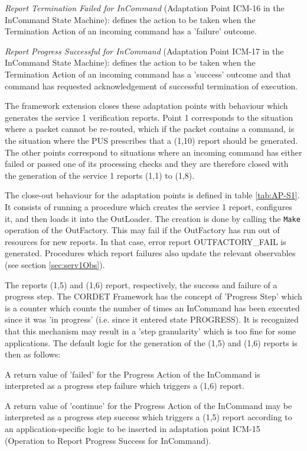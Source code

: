 \documentclass[a4paper,10pt]{article}
\newenvironment{fw_itemize}						%
{\begin{itemize}
  \setlength{\itemsep}{1mm}
  \setlength{\parskip}{0pt}
  \setlength{\parsep}{0pt}}
{\end{itemize}}
\newenvironment{fw_enumerate}					%
{\begin{enumerate}
  \setlength{\itemsep}{1mm}
  \setlength{\parskip}{0pt}
  \setlength{\parsep}{0pt}}
{\end{enumerate}}
\begin{document}
\begin{fw_enumerate}
\item \textit{Report Termination Failed for InCommand} (Adaptation Point ICM-16 in the InCommand State Machine): defines the action to be taken when the Termination Action of an incoming command has a 'failure' outcome.
\item \textit{Report Progress Successful for InCommand} (Adaptation Point ICM-17 in the InCommand State Machine): defines the action to be taken when the Termination Action of an incoming command has a 'success' outcome and that command has requested acknowledgement of successful termination of execution.
\end{fw_enumerate}

The framework extension closes these adaptation points with behaviour which generates the service 1 verification reports. Point 1 corresponds to the situation where a packet cannot be re-routed, which if the packet contains a command, is the situation where the PUS prescribes that a (1,10) report should be generated. The other points correspond to situations where an incoming command has either failed or passed one of its processing checks and they are therefore closed with the generation of the service 1 reports (1,1) to (1,8). 

The close-out behaviour for the adaptation points is defined in table \ref{tab:AP-S1}. It consists of running a procedure which creates the service 1 report, configures it, and then loads it into the OutLoader. The creation is done by calling the \texttt{Make} operation of the OutFactory. This may fail if the OutFactory has run out of resources for new reports. In that case, error report OUTFACTORY\_FAIL is generated. Procedures which report failures also update the relevant observables (see section \ref{sec:serv1Obs}).

The reports (1,5) and (1,6) report, respectively, the success and failure of a progress step. The CORDET Framework has the concept of 'Progress Step' which is a counter which counts the number of times an InCommand has been executed since it was 'in progress' (i.e. since it entered state PROGRESS). It is recognized that this mechanism may result in a 'step granularity' which is too fine for some applications. The default logic for the generation of the (1,5) and (1,6) reports is then as follows:

\begin{fw_itemize}
\item A return value of 'failed' for the Progress Action of the InCommand is interpreted as a progress step failure which triggers a (1,6) report. 
\item A return value of 'continue' for the Progress Action of the InCommand may be interpreted as a progress step success which triggers a (1,5) report according to an application-specific logic to be inserted in adaptation point ICM-15 (Operation to Report Progress Success for InCommand). 
\end{fw_itemize}
\end{document}
